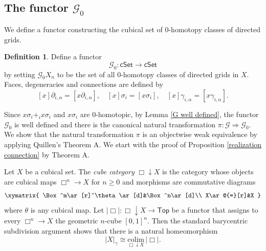 \documentclass[oneside, 12pt]{amsart}
\numberwithin{equation}{section}
\theoremstyle{plain}
\newtheorem{lemma}[theorem]{Lemma}
\theoremstyle{definition}
\newtheorem{definition}[theorem]{Definition}
\theoremstyle{remark}
\newcommand{\cSet}{\mathsf{cSet}}
\begin{document}
	
	
	\subsection{The functor $\mathcal{G}_0$}
	
	We define a functor constructing the cubical set of 0-homotopy classes of directed grids.
	
	\begin{definition}
		Define a functor
		\[
		\mathcal{G}_0\colon\cSet\to\cSet
		\]
		by setting $\mathcal{G}_0X_n$ to be the set of all 0-homotopy classes of directed grids in $X$. Faces, degeneracies and connections are defined by
		\[
		[x]\partial_{i,\alpha}=[x\partial_{i,\alpha}],\quad[x]\sigma_i=[x\sigma_i],\quad[x]\gamma_{i,\alpha}=[x\gamma_{i,\alpha}].
		\]
	\end{definition}
	
	
	
	Since $x\sigma_i+_ix\sigma_i$ and $x\sigma_i$ are 0-homotopic, by Lemma \ref{G well defined}, the functor $\mathcal{G}_0$ is well defined and there is the canonical natural transformation $\pi\colon\mathcal{G}\Rightarrow\mathcal{G}_0$. We show that the natural transformation $\pi$ is an objectwise weak equivalence by applying Quillen's Theorem A. We start with the proof of Proposition \ref{realization connection} by Theorem A.
	
	
	
	Let $X$ be a cubical set. The \emph{cube category} $\Box\downarrow X$ is the category whose objects are cubical maps $\Box^n\to X$ for $n\ge 0$ and morphisms are commutative diagrams
	\begin{equation}
		\label{cube cat morphism}
		\xymatrix{
			\Box^m\ar[r]^\theta\ar[d]&\Box^n\ar[d]\\
			X\ar@{=}[r]&X
		}
	\end{equation}
	where $\theta$ is any cubical map. %
	Let $|\Box|\colon\Box\downarrow X\to\mathsf{Top}$ be a functor that assigns to every $\Box^n\to X$ the geometric $n$-cube $[0,1]^n$. Then the standard barycentric subdivision argument shows that there is a natural homeomorphism
	\begin{equation}
		\label{cube cat homeo}
		|X|_\gamma\cong\underset{\Box\downarrow X}{\mathrm{colim}}\,|\Box|.
	\end{equation}
	
\end{document}
